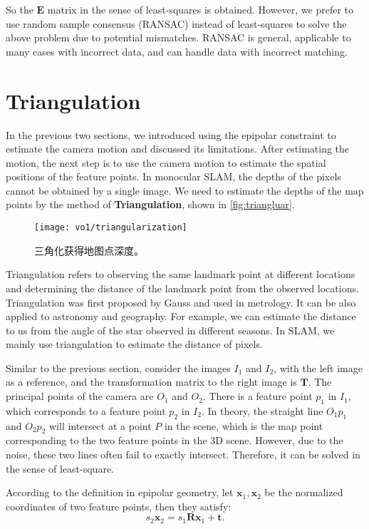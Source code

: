So the $\mathbf{E}$ matrix in the sense of least-squares is obtained. However, we prefer to use random sample consensus (RANSAC) instead of least-squares to solve the above problem due to potential mismatches. RANSAC is general, applicable to many cases with incorrect data, and can handle data with incorrect matching.

\section{Triangulation}
\label{sec:7.5}
In the previous two sections, we introduced using the epipolar constraint to estimate the camera motion and discussed its limitations. After estimating the motion, the next step is to use the camera motion to estimate the spatial positions of the feature points. In monocular SLAM, the depths of the pixels cannot be obtained by a single image. We need to estimate the depths of the map points by the method of \textbf{Triangulation}, shown in \autoref{fig:triangluar}.

\begin{figure}[!ht]
	\centering
	\texttt{[image: vo1/triangularization]}
	\caption{三角化获得地图点深度。}
	\label{fig:triangluar}
\end{figure}

Triangulation refers to observing the same landmark point at different locations and determining the distance of the landmark point from the observed locations. Triangulation was first proposed by Gauss and used in metrology. It can be also applied to astronomy and geography. For example, we can estimate the distance to us from the angle of the star observed in different seasons. In SLAM, we mainly use triangulation to estimate the distance of pixels.

Similar to the previous section, consider the images $I_{1}$ and $I_{2}$, with the left image as a reference, and the transformation matrix to the right image is $\mathbf{T}$. The principal points of the camera are $O_{1}$ and $O_{2}$. There is a feature point $p_{1}$ in $I_{1}$, which corresponds to a feature point $p_{2}$ in $I_{2}$. In theory, the straight line $O_{1}p_{1}$ and $O_{2}p_{2}$ will intersect at a point $P$ in the scene, which is the map point corresponding to the two feature points in the 3D scene. However, due to the noise, these two lines often fail to exactly intersect. Therefore, it can be solved in the sense of least-square.

According to the definition in epipolar geometry, let $\mathbf{x}_1, \mathbf{x}_2$ be the normalized coordinates of two feature points, then they satisfy:
\begin{equation}
s_2 \mathbf{x}_2 = s_1  \mathbf{R} \mathbf{x}_1 + \mathbf{t}.  
\end{equation}

